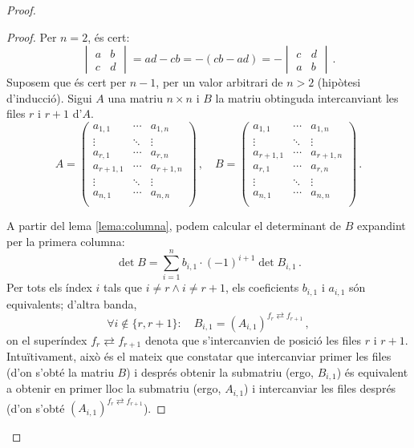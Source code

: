 \begin{teo}
\begin{proof}
\begin{lema}
		\begin{adjustwidth}{0.8cm}{}
		\begin{proof}
			Per $n=2$, és cert: \[
			\begin{vmatrix}
			a & b \\
			c & d
			\end{vmatrix} = ad - cb = -(cb - ad) = -
			\begin{vmatrix}
			c & d \\
			a & b
			\end{vmatrix}\,. \]
			Suposem que és cert per $n - 1$, per un valor arbitrari de $n > 2$ (hipòtesi d'inducció). Sigui $A$ una matriu $n\times n$ i $B$ la matriu obtinguda intercanviant les files $r$ i $r+1$ d'$A$. 
			\[A =
			\begin{pmatrix}
			a_{1,1} &	\cdots &	a_{1,n} \\
			\vdots &	\ddots &	\vdots \\
			a_{r,1} &	\cdots &	a_{r,n} \\
			a_{r+1,1} &	\cdots &	a_{r+1,n} \\
			\vdots &	\ddots &	\vdots \\
			a_{n,1} &	\cdots &	a_{n,n} \\
			\end{pmatrix}\,, \quad
			B =
			\begin{pmatrix}
			a_{1,1} &	\cdots &	a_{1,n} \\
			\vdots &	\ddots &	\vdots \\
			a_{r+1,1} &	\cdots &	a_{r+1,n} \\
			a_{r,1} &	\cdots &	a_{r,n} \\
			\vdots &	\ddots &	\vdots \\
			a_{n,1} &	\cdots &	a_{n,n} \\
			\end{pmatrix}\,.
			\]
			
			A partir del lema \ref{lema:columna}, podem calcular el determinant de $B$ expandint per la primera columna: 
			\begin{equation}\label{eq:det2}
				\det B = \sum_{i=1}^{n} b_{i,1}\cdot(-1)^{i+1}\det B_{i,1}\,.
			\end{equation}
			Per tots els índex $i$ tals que $i\ne r \land i\ne r+1$, els coeficients $b_{i,1}$ i $a_{i,1}$ són equivalents; d'altra banda, 
			\begin{equation}\label{eq:submat}
			\forall i \notin \{r,r+1\} :\quad B_{i,1} = (A_{i,1})^{f_r\rightleftarrows f_{r+1}}\,,
			\end{equation}
			on el superíndex $f_r\rightleftarrows f_{r+1}$ denota que s'intercanvien de posició les files $r$ i $r+1$. Intuïtivament, això és el mateix que constatar que intercanviar primer les files (d'on s'obté la matriu $B$) i després obtenir la submatriu (ergo, $B_{i,1}$) és equivalent a obtenir en primer lloc la submatriu (ergo, $A_{i,1}$) i intercanviar les files després (d'on s'obté $(A_{i,1})^{f_r\rightleftarrows f_{r+1}}$).
			

\end{proof}
\end{adjustwidth}
\end{lema}
\end{proof}
\end{teo}
